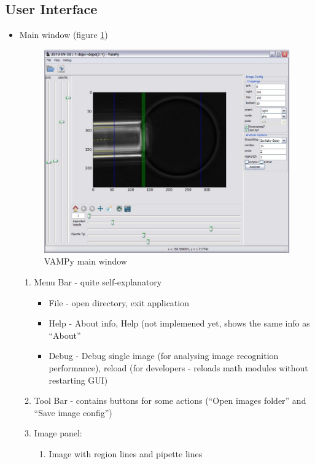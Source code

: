 \subsection{User Interface}\label{vampy-ui}
\begin{itemize}
	\item Main window (figure \ref{fig:vampymain})
		\begin{figure}[htbp]
			\centering
			\includegraphics[width=1.00\textwidth]{figs/vampymain.pdf}
			\caption{VAMPy main window}
			\label{fig:vampymain}
		\end{figure}
		\begin{enumerate}
				\item Menu Bar - quite self-explanatory
					\begin{itemize}
						\item File - open directory, exit application
						\item Help - About info, Help (not implemened yet, shows the same info as ``About''
						\item Debug - Debug single image (for analysing image recognition performance), reload (for developers - reloads math modules without restarting GUI)
					\end{itemize}
				\item Tool Bar - contains buttons for some actions (``Open images folder'' and ``Save image config'')
				\item Image panel:
					\begin{enumerate}
						\item Image with region lines and pipette lines

\end{enumerate}
\end{enumerate}
\end{itemize}

